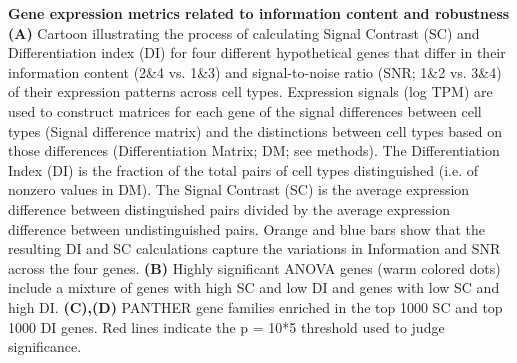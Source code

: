 \textbf{Gene expression metrics related to information content and robustness} \textbf{(A)} Cartoon illustrating the process of calculating Signal Contrast (SC) and Differentiation index (DI) for four different hypothetical genes that differ in their information content (2\&4 vs. 1\&3) and signal-to-noise ratio (SNR; 1\&2 vs. 3\&4) of their expression patterns across cell types. Expression signals (log TPM) are used to construct matrices for each gene of the signal differences between cell types (Signal difference matrix) and the distinctions between cell types based on those differences (Differentiation Matrix; DM; see methods). The Differentiation Index (DI) is the fraction of the total pairs of cell types distinguished (i.e. of nonzero values in DM). The Signal Contrast (SC) is the average expression difference between distinguished pairs divided by the average expression difference between undistinguished pairs. Orange and blue bars show that the resulting DI and SC calculations capture the variations in Information and SNR across the four genes. \textbf{(B)} Highly significant ANOVA genes (warm colored dots) include a mixture of genes with high SC and low DI and genes with low SC and high DI. \textbf{(C),(D)} PANTHER gene families enriched in the top 1000 SC and top 1000 DI genes. Red lines indicate the p = 10*5 threshold used to judge significance. 